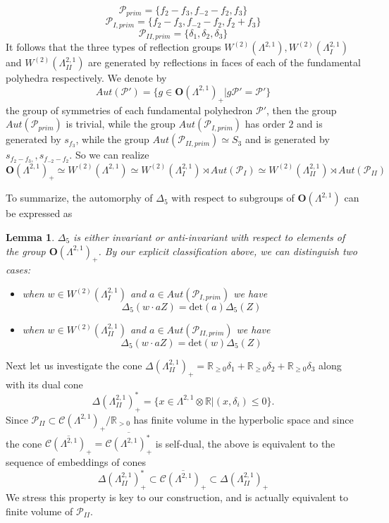 \documentclass[9pt]{amsart} \usepackage[utf8]{inputenc}
\newtheorem{lemma}{Lemma}
\newcommand{\R}{\mathbb{R}} \newcommand{\La}{\Lambda}
\newcommand{\Orth}{\mathbf{O}}
\newcommand{\Cone}{\mathcal{C}}
\newcommand{\Poly}{\mathcal{P}}
\begin{document}
 $$\Poly_{prim} = \{f_2 - f_3, f_{-2} - f_2, f_3\}$$
 $$\Poly_{I,prim} = \{f_2 -f_3, f_{-2} - f_2, f_2 + f_3\}$$
 $$\Poly_{II,prim} = \{\delta_1, \delta_2, \delta_3\}$$
It follows that the three types of reflection groups $W^{(2)}(\La^{2,1}),
W^{(2)}(\La^{2,1}_I)$ and $W^{(2)}(\La^{2,1}_{II})$ are generated by
reflections in faces of each of the fundamental polyhedra respectively. We denote
by $$Aut(\Poly') = \{g \in \Orth(\La^{2,1})_+ | g \Poly' = \Poly' \}$$ the
group of symmetries of each fundamental polyhedron $\Poly'$, then the group
$Aut(\Poly_{prim})$ is trivial, while the group $Aut(\Poly_{I,prim})$ has order
$2$ and is generated by $s_{f_3}$, while the group $Aut(\Poly_{II,prim})
\simeq S_3$ and is generated by $s_{f_2 -f_3,}, s_{f_{-2} - f_2}$. So we
can realize $$\Orth(\La^{2,1})_+ \simeq W^{(2)}(\La^{2,1}) \simeq W^{(2)}(\La^{2,1}_I) \rtimes Aut(\Poly_{I}) \simeq
W^{(2)}(\La^{2,1}_{II}) \rtimes Aut(\Poly_{II})$$

To summarize, the automorphy of $\Delta_5$ with respect to subgroups of
$\Orth(\La^{2,1})$ can be expressed as

\begin{lemma}
$\Delta_5$ is either invariant or anti-invariant with respect to elements
of the group $\Orth(\La^{2,1})_+$. By our explicit classification above, we can
distinguish two cases:
\begin{itemize}
  \item when $w \in W^{(2)}(\La^{2,1}_I)$ and $a \in Aut(\Poly_{I,prim})$ we
  have
  $$\Delta_5(w \cdot a Z) = \text{det}(a) \Delta_5(Z)$$
  \item when $w \in W^{(2)}(\La^{2,1}_{II})$ and $a \in Aut(\Poly_{II,prim})$ we
  have
  $$\Delta_5(w \cdot a Z) = \text{det}(w) \Delta_5(Z)$$
\end{itemize}

\end{lemma}

Next let us investigate the cone $\Delta(\La^{2,1}_{II})_+ = \R_{\geq 0} \delta_1 + \R_{\geq 0} \delta_2
+ \R_{\geq 0} \delta_3$ along with its dual cone
$$\Delta(\La^{2,1}_{II})_+^* = \{ x \in \La^{2,1} \otimes \R | (x,
\delta_i) \leq 0 \}.$$ Since $\Poly_{II} \subset \Cone(\La^{2,1})_+ /
\R_{>0}$ has finite volume in the hyperbolic space and since the cone
$\overline{\Cone(\La^{2,1})_+} = \overline{\Cone(\La^{2,1})_+^*}$ is
self-dual, the above is equivalent to the sequence of embeddings of
cones
$$\Delta(\La^{2,1}_{II})_+^* \subset
\overline{\Cone(\La^{2,1})_+} \subset  \Delta(\La^{2,1}_{II})_+$$
We stress this property is key to our construction, and is actually equivalent to
finite volume of $\Poly_{II}$.
\end{document}
